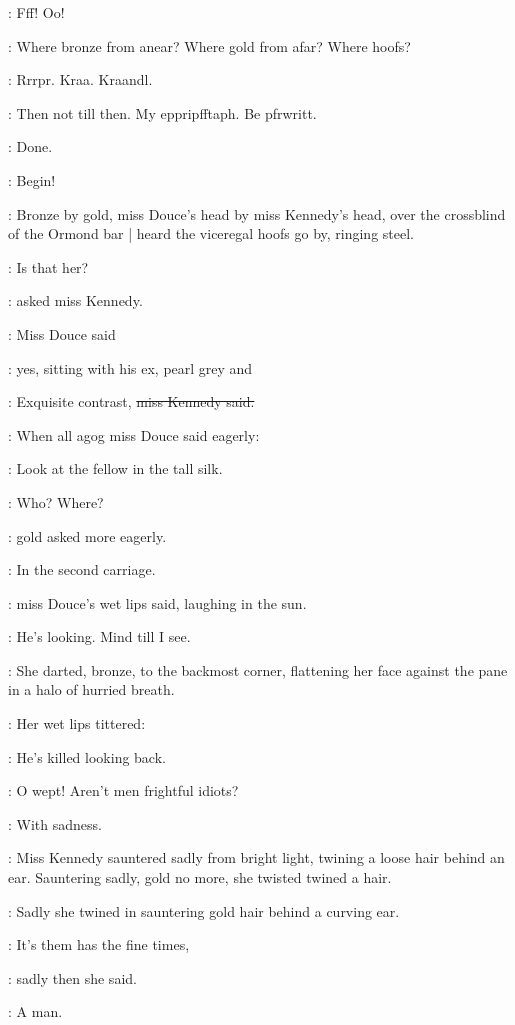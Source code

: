 :
Fff!
Oo!

\BloomInt:
Where bronze from anear?
Where gold from afar?
Where hoofs?

:
Rrrpr.
Kraa.
Kraandl.

\BloomInt:
Then not till then.
My eppripfftaph.
Be pfrwritt.

\BloomInt:
Done.

\BloomInt:
Begin!



:
Bronze by gold,
miss Douce's head by miss Kennedy's head,
over the crossblind of the Ormond bar |
heard the viceregal hoofs go by,
ringing steel.

\MissK:
Is that her?

:
asked miss Kennedy.

:
Miss Douce said

\MissD:
yes,
sitting with his ex,
pearl grey and 

\MissK:
Exquisite contrast,
\sout{miss Kennedy said.}

:
When all agog miss Douce said eagerly:

\MissD:
Look at the fellow
in the tall silk.

\MissK:
Who? Where?

:
gold asked more eagerly.

\MissD:
In the second carriage.

:
miss Douce's wet lips said, laughing in the sun.

\MissD:
He's looking. Mind till I see.

:
She darted, bronze, to the backmost corner, flattening her face
against the pane in a halo of hurried breath.

:
Her wet lips tittered:

\MissD:
He's killed looking back.

\MissD:
O wept! Aren't men frightful idiots?

:
With sadness.

:
Miss Kennedy sauntered sadly from bright light, twining a loose hair
behind an ear. Sauntering sadly, gold no more, she twisted twined
a hair.

:
Sadly she twined in sauntering gold hair behind a curving ear.

\MissK:
It's them has the fine times,

:
sadly then she said.

:
A man.

